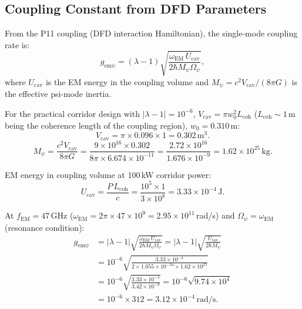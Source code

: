 \documentclass[aps,prd,twocolumn,superscriptaddress]{revtex4-2}
\begin{document}
\subsection{Coupling Constant from DFD Parameters}

From the P11 coupling (DFD interaction Hamiltonian), the single-mode
coupling rate is:
\begin{equation}
g_\mathrm{em\psi} = (\lambda-1)\sqrt{\frac{\omega_\mathrm{EM}\,U_\mathrm{cav}}{2\hbar M_\psi\Omega_\psi}},
\label{eq:g_coupling}
\end{equation}
where $U_\mathrm{cav}$ is the EM energy in the coupling volume and
$M_\psi = c^2 V_\mathrm{cav}/(8\pi G)$ is the effective psi-mode inertia.

For the practical corridor design with $|\lambda-1| = 10^{-6}$,
$V_\mathrm{cav} = \pi w_0^2 L_\mathrm{coh}$ ($L_\mathrm{coh} \sim 1$\,m
being the coherence length of the coupling region),
$w_0 = 0.310$\,m:
\begin{equation}
V_\mathrm{cav} = \pi\times0.096\times1 = 0.302\,\mathrm{m}^3.
\end{equation}
\begin{equation}
M_\psi = \frac{c^2 V_\mathrm{cav}}{8\pi G}
= \frac{9\times10^{16}\times0.302}{8\pi\times6.674\times10^{-11}}
= \frac{2.72\times10^{16}}{1.676\times10^{-9}}
= 1.62\times10^{25}\,\mathrm{kg}.
\label{eq:M_psi}
\end{equation}

EM energy in coupling volume at 100\,kW corridor power:
\begin{equation}
U_\mathrm{cav} = \frac{P\,L_\mathrm{coh}}{c} = \frac{10^5\times1}{3\times10^8}
= 3.33\times10^{-4}\,\mathrm{J}.
\end{equation}

At $f_\mathrm{EM} = 47$\,GHz ($\omega_\mathrm{EM} = 2\pi\times47\times10^9
= 2.95\times10^{11}$\,rad/s) and $\Omega_\psi = \omega_\mathrm{EM}$
(resonance condition):
\begin{align}
g_\mathrm{em\psi} &= |\lambda-1|\sqrt{\frac{\omega_\mathrm{EM}\,U_\mathrm{cav}}{2\hbar M_\psi\Omega_\psi}}
= |\lambda-1|\sqrt{\frac{U_\mathrm{cav}}{2\hbar M_\psi}}
\nonumber\\
&= 10^{-6}\sqrt{\frac{3.33\times10^{-4}}{2\times1.055\times10^{-34}\times1.62\times10^{25}}}
\nonumber\\
&= 10^{-6}\sqrt{\frac{3.33\times10^{-4}}{3.42\times10^{-9}}}
= 10^{-6}\sqrt{9.74\times10^{4}}
\nonumber\\
&= 10^{-6}\times312 = 3.12\times10^{-4}\,\mathrm{rad/s}.
\label{eq:g_numerical}
\end{align}
\end{document}
